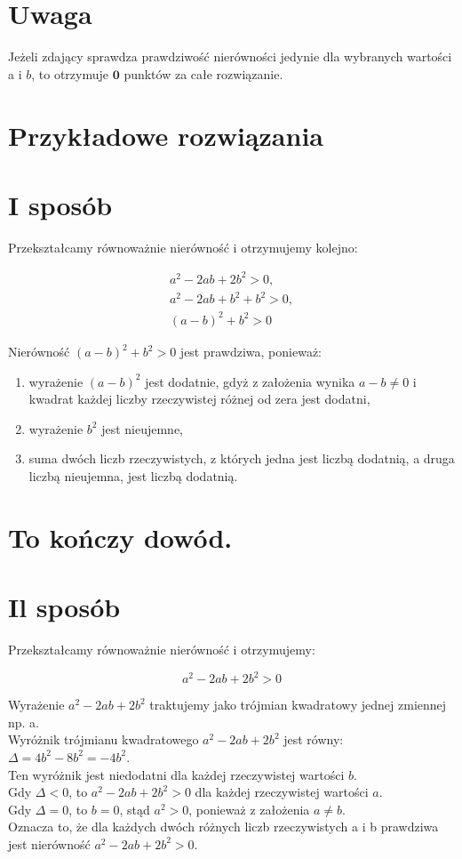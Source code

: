\documentclass[10pt]{article}
\begin{document}
\section*{Uwaga}
Jeżeli zdający sprawdza prawdziwość nierówności jedynie dla wybranych wartości a i $b$, to otrzymuje $\mathbf{0}$ punktów za całe rozwiązanie.

\section*{Przykładowe rozwiązania}
\section*{I sposób}
Przekształcamy równoważnie nierówność i otrzymujemy kolejno:

$$
\begin{gathered}
a^{2}-2 a b+2 b^{2}>0, \\
a^{2}-2 a b+b^{2}+b^{2}>0, \\
(a-b)^{2}+b^{2}>0
\end{gathered}
$$

Nierówność $(a-b)^{2}+b^{2}>0$ jest prawdziwa, ponieważ:

\begin{enumerate}
  \item wyrażenie $(a-b)^{2}$ jest dodatnie, gdyż z założenia wynika $a-b \neq 0$ i kwadrat każdej liczby rzeczywistej różnej od zera jest dodatni,
  \item wyrażenie $b^{2}$ jest nieujemne,
  \item suma dwóch liczb rzeczywistych, z których jedna jest liczbą dodatnią, a druga liczbą nieujemna, jest liczbą dodatnią.
\end{enumerate}

\section*{To kończy dowód.}
\section*{Il sposób}
Przekształcamy równoważnie nierówność i otrzymujemy:

$$
a^{2}-2 a b+2 b^{2}>0
$$

Wyrażenie $a^{2}-2 a b+2 b^{2}$ traktujemy jako trójmian kwadratowy jednej zmiennej np. a.\\
Wyróżnik trójmianu kwadratowego $a^{2}-2 a b+2 b^{2}$ jest równy: $\Delta=4 b^{2}-8 b^{2}=-4 b^{2}$.\\
Ten wyróżnik jest niedodatni dla każdej rzeczywistej wartości $b$.\\
Gdy $\Delta<0$, to $a^{2}-2 a b+2 b^{2}>0$ dla każdej rzeczywistej wartości $a$.\\
Gdy $\Delta=0$, to $b=0$, stąd $a^{2}>0$, ponieważ z założenia $a \neq b$.\\
Oznacza to, że dla każdych dwóch różnych liczb rzeczywistych a i b prawdziwa jest nierówność $a^{2}-2 a b+2 b^{2}>0$.
\end{document}
